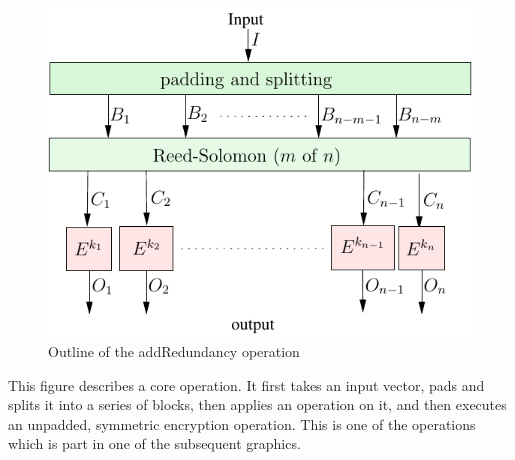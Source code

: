 \documentclass{extarticle}
\begin{document}
	\begin{figure}[ht]\centering
		\includegraphics[width=0.8\columnwidth]{inc/addRedundancyOp}
		\caption{Outline of the addRedundancy operation}
		\label{fig:addRedundancyOperation}
	\end{figure}
	This figure describes a core operation. It first takes an input vector, pads and splits it into a series of blocks, then applies an operation on it, and then executes an unpadded, symmetric encryption operation. This is one of the operations which is part in one of the subsequent graphics.
	
	
\end{document}
